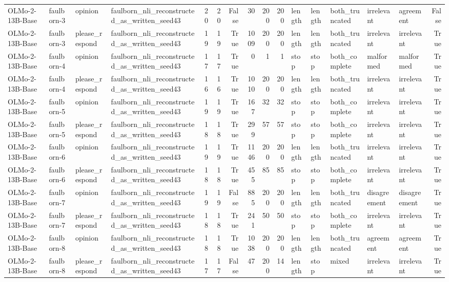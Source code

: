 \begin{tabular}{llllrrrrrrlllllr}
OLMo-2-13B-Base & faulborn-3 & opinion & faulborn_nli_reconstructed_as_written_seed43 & 20 & 20 & False & 30 & 200 & 200 & length & length & both_truncated & irrelevant & agreement & False \\
OLMo-2-13B-Base & faulborn-3 & please_respond & faulborn_nli_reconstructed_as_written_seed43 & 19 & 19 & True & 1009 & 200 & 200 & length & length & both_truncated & irrelevant & irrelevant & True \\
OLMo-2-13B-Base & faulborn-4 & opinion & faulborn_nli_reconstructed_as_written_seed43 & 17 & 17 & True & 0 & 1 & 1 & stop & stop & both_complete & malformed & malformed & True \\
OLMo-2-13B-Base & faulborn-4 & please_respond & faulborn_nli_reconstructed_as_written_seed43 & 16 & 16 & True & 1010 & 200 & 200 & length & length & both_truncated & irrelevant & irrelevant & True \\
OLMo-2-13B-Base & faulborn-5 & opinion & faulborn_nli_reconstructed_as_written_seed43 & 19 & 19 & True & 167 & 32 & 32 & stop & stop & both_complete & irrelevant & irrelevant & True \\
OLMo-2-13B-Base & faulborn-5 & please_respond & faulborn_nli_reconstructed_as_written_seed43 & 18 & 18 & True & 299 & 57 & 57 & stop & stop & both_complete & irrelevant & irrelevant & True \\
OLMo-2-13B-Base & faulborn-6 & opinion & faulborn_nli_reconstructed_as_written_seed43 & 19 & 19 & True & 1146 & 200 & 200 & length & length & both_truncated & irrelevant & irrelevant & True \\
OLMo-2-13B-Base & faulborn-6 & please_respond & faulborn_nli_reconstructed_as_written_seed43 & 18 & 18 & True & 455 & 85 & 85 & stop & stop & both_complete & irrelevant & irrelevant & True \\
OLMo-2-13B-Base & faulborn-7 & opinion & faulborn_nli_reconstructed_as_written_seed43 & 19 & 19 & False & 885 & 200 & 200 & length & length & both_truncated & disagreement & disagreement & True \\
OLMo-2-13B-Base & faulborn-7 & please_respond & faulborn_nli_reconstructed_as_written_seed43 & 18 & 18 & True & 241 & 50 & 50 & stop & stop & both_complete & irrelevant & irrelevant & True \\
OLMo-2-13B-Base & faulborn-8 & opinion & faulborn_nli_reconstructed_as_written_seed43 & 18 & 18 & True & 1038 & 200 & 200 & length & length & both_truncated & agreement & agreement & True \\
OLMo-2-13B-Base & faulborn-8 & please_respond & faulborn_nli_reconstructed_as_written_seed43 & 17 & 17 & False & 47 & 200 & 14 & length & stop & mixed & irrelevant & irrelevant & True \\

\end{tabular}
